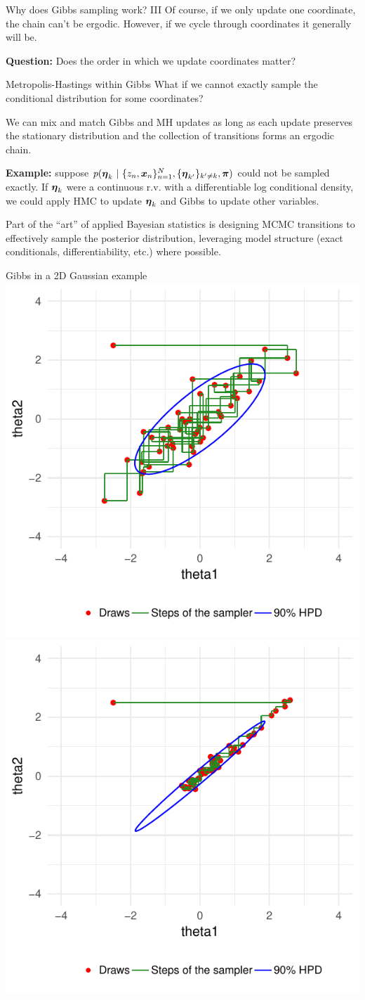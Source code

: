 \documentclass[aspectratio=169]{beamer}
\begin{document}
\begin{frame}[t]{Why does Gibbs sampling work? III}
Of course, if we only update one coordinate, the chain can't be ergodic. However, if we cycle through coordinates it generally will be. 

\textbf{Question: } Does the order in which we update coordinates matter?
\end{frame}

\begin{frame}[t]{Metropolis-Hastings within Gibbs}
What if we cannot exactly sample the conditional distribution for some coordinates?

We can mix and match Gibbs and MH updates as long as each update preserves the stationary distribution and the collection of transitions forms an ergodic chain.

\textbf{Example: } suppose $p(\boldsymbol{\eta}_k ~\vert~ \{z_n, \boldsymbol{x}_n\}_{n=1}^N, \{\boldsymbol{\eta}_{k'}\}_{k' \neq k}, \boldsymbol{\pi})$ could not be sampled exactly. If $\boldsymbol{\eta}_k$ were a continuous r.v. with a differentiable log conditional density, we could apply HMC to update $\boldsymbol{\eta}_k$ and Gibbs to update other variables. 

Part of the ``art'' of applied Bayesian statistics is designing MCMC transitions to effectively sample the posterior distribution, leveraging model structure (exact conditionals, differentiability, etc.) where possible.

\end{frame}

\begin{frame}{Gibbs in a 2D Gaussian example}
\centering
\includegraphics[width=.45\textwidth]{figures/lap4/Gibbs1.pdf}
\includegraphics[width=.45\textwidth]{figures/lap4/Gibbs2.pdf}
\end{frame}
\end{document}
